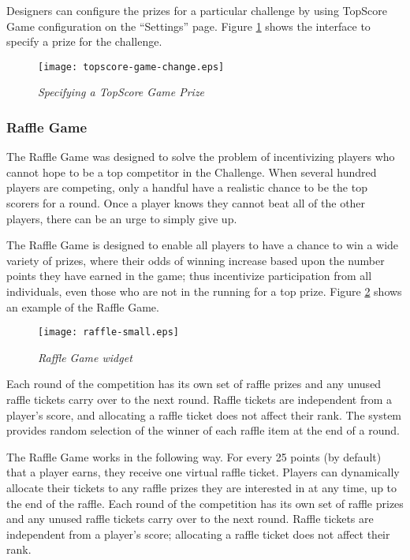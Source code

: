 Designers can configure the prizes for a particular challenge by using TopScore Game configuration on the ``Settings'' page. Figure \ref{fig:topscore-game-change} shows the interface to specify a prize for the challenge.

\begin{figure}[!ht]
  \center
  \texttt{[image: topscore-game-change.eps]}
  \caption{\em Specifying a TopScore Game Prize}
  \label{fig:topscore-game-change}
\end{figure}

\clearpage

\subsubsection{Raffle Game}

The Raffle Game was designed to solve the problem of incentivizing players who cannot hope to be a top competitor in the Challenge. When several hundred players are competing, only a handful have a realistic chance to be the top scorers for a round. Once a player knows they cannot beat all of the other players, there can be an urge to simply give up.

The Raffle Game is designed to enable all players to have a chance to win a wide variety of prizes, where their odds of winning increase based upon the number points they have earned in the game; thus incentivize participation from all individuals, even those who are not in the running for a top prize. Figure \ref{fig:RaffleGame} shows an example of the Raffle Game.

\begin{figure}[!ht]
  \center
  \texttt{[image: raffle-small.eps]}
  \caption{\em Raffle Game widget}
  \label{fig:RaffleGame}
\end{figure}

Each round of the competition has its own set of raffle prizes and any unused raffle tickets carry over to the next round. Raffle tickets are independent from a player's score, and allocating a raffle ticket does not affect their rank. The system provides random selection of the winner of each raffle item at the end of a round.

The Raffle Game works in the following way. For every 25 points (by default) that a player earns, they receive one virtual raffle ticket. Players can dynamically allocate their tickets to any raffle prizes they are interested in at any time, up to the end of the raffle. Each round of the competition has its own set of raffle prizes and any unused raffle tickets carry over to the next round. Raffle tickets are independent from a player's score; allocating a raffle ticket does not affect their rank.

